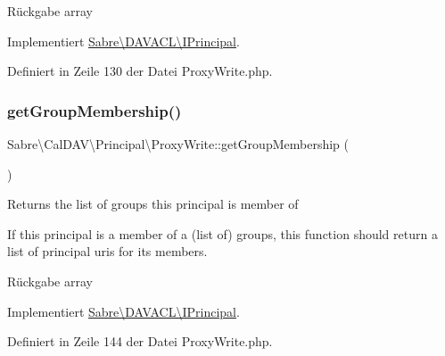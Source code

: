 \begin{DoxyReturn}{Rückgabe}
array 
\end{DoxyReturn}


Implementiert \mbox{\hyperlink{interface_sabre_1_1_d_a_v_a_c_l_1_1_i_principal_ad9f9e4ed25ec5ec9325288b076cdd09f}{Sabre\textbackslash{}\+D\+A\+V\+A\+C\+L\textbackslash{}\+I\+Principal}}.



Definiert in Zeile 130 der Datei Proxy\+Write.\+php.

\mbox{\label{class_sabre_1_1_cal_d_a_v_1_1_principal_1_1_proxy_write_af370032d4f7d8140d6ac341ccf429bec}} 
\subsubsection{\texorpdfstring{get\+Group\+Membership()}{getGroupMembership()}}
{\footnotesize\ttfamily Sabre\textbackslash{}\+Cal\+D\+A\+V\textbackslash{}\+Principal\textbackslash{}\+Proxy\+Write\+::get\+Group\+Membership (\begin{DoxyParamCaption}{ }\end{DoxyParamCaption})}

Returns the list of groups this principal is member of

If this principal is a member of a (list of) groups, this function should return a list of principal uri\textquotesingle{}s for it\textquotesingle{}s members.

\begin{DoxyReturn}{Rückgabe}
array 
\end{DoxyReturn}


Implementiert \mbox{\hyperlink{interface_sabre_1_1_d_a_v_a_c_l_1_1_i_principal_a8921b6c6ba5421dd0a6f6ba26def6fbd}{Sabre\textbackslash{}\+D\+A\+V\+A\+C\+L\textbackslash{}\+I\+Principal}}.



Definiert in Zeile 144 der Datei Proxy\+Write.\+php.

\mbox{\label{class_sabre_1_1_cal_d_a_v_1_1_principal_1_1_proxy_write_a4de8a2ec69b5707ccb3b737fe4e7b089}} 
